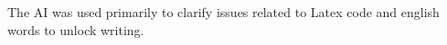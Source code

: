 







\begin{AIDcomment}
The AI was used primarily to clarify issues related to Latex code and english words to unlock writing.
\end{AIDcomment}

